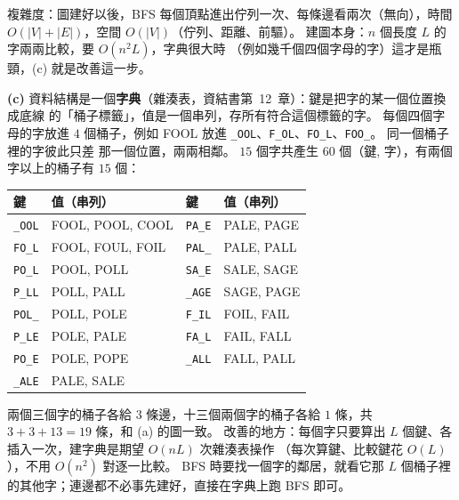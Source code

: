 \begin{pastsoln}
複雜度：圖建好以後，BFS 每個頂點進出佇列一次、每條邊看兩次（無向），時間 $O(|V| + |E|)$，空間
$O(|V|)$（佇列、距離、前驅）。 建圖本身：$n$ 個長度 $L$ 的字兩兩比較，要 $O(n^2 L)$，字典很大時
（例如幾千個四個字母的字）這才是瓶頸，(c) 就是改善這一步。

\textbf{(c)} 資料結構是一個\textbf{字典}（雜湊表，資結書第~12~章）：鍵是把字的某一個位置換成底線
的「桶子標籤」，值是一個串列，存所有符合這個標籤的字。 每個四個字母的字放進 $4$ 個桶子，例如
FOOL 放進 \texttt{\_OOL}、\texttt{F\_OL}、\texttt{FO\_L}、\texttt{FOO\_}。 同一個桶子裡的字彼此只差
那一個位置，兩兩相鄰。 $15$ 個字共產生 $60$ 個（鍵, 字），有兩個字以上的桶子有 $15$ 個：
\begin{center}
\begin{tabular}{ll@{\qquad}ll}
\toprule
鍵 & 值（串列） & 鍵 & 值（串列） \\
\midrule
\texttt{\_OOL} & FOOL, POOL, COOL & \texttt{PA\_E} & PALE, PAGE \\
\texttt{FO\_L} & FOOL, FOUL, FOIL & \texttt{PAL\_} & PALE, PALL \\
\texttt{PO\_L} & POOL, POLL & \texttt{SA\_E} & SALE, SAGE \\
\texttt{P\_LL} & POLL, PALL & \texttt{\_AGE} & SAGE, PAGE \\
\texttt{POL\_} & POLL, POLE & \texttt{F\_IL} & FOIL, FAIL \\
\texttt{P\_LE} & POLE, PALE & \texttt{FA\_L} & FAIL, FALL \\
\texttt{PO\_E} & POLE, POPE & \texttt{\_ALL} & FALL, PALL \\
\texttt{\_ALE} & PALE, SALE & & \\
\bottomrule
\end{tabular}
\end{center}
兩個三個字的桶子各給 $3$ 條邊，十三個兩個字的桶子各給 $1$ 條，共 $3 + 3 + 13 = 19$ 條，和 (a)
的圖一致。 改善的地方：每個字只要算出 $L$ 個鍵、各插入一次，建字典是期望 $O(nL)$ 次雜湊表操作
（每次算鍵、比較鍵花 $O(L)$），不用 $O(n^2)$ 對逐一比較。 BFS 時要找一個字的鄰居，就看它那
$L$ 個桶子裡的其他字；連邊都不必事先建好，直接在字典上跑 BFS 即可。
\end{pastsoln}
